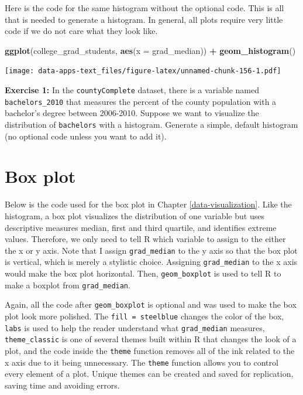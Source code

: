 \documentclass[
]{book}
\newenvironment{Shaded}{\begin{snugshade}}{\end{snugshade}}
\newcommand{\DataTypeTok}[1]{\textcolor[rgb]{0.13,0.29,0.53}{#1}}
\newcommand{\KeywordTok}[1]{\textcolor[rgb]{0.13,0.29,0.53}{\textbf{#1}}}
\newcommand{\NormalTok}[1]{#1}
\newcommand{\OperatorTok}[1]{\textcolor[rgb]{0.81,0.36,0.00}{\textbf{#1}}}
\newcommand{\StringTok}[1]{\textcolor[rgb]{0.31,0.60,0.02}{#1}}
\newenvironment{learncheck}%
{%
  \par\vspace{\baselineskip}\noindent 
  \color{Exercise}\begin{itshape}%
  \par\vspace{\baselineskip}\noindent\ignorespaces 
}%
{%
  \end{itshape}\ignorespacesafterend 
}
\begin{document}
Here is the code for the same histogram without the optional code. This is all that is needed to generate a histogram. In general, all plots require very little code if we do not care what they look like.

\begin{Shaded}
\begin{Highlighting}[]
\KeywordTok{ggplot}\NormalTok{(college_grad_students, }\KeywordTok{aes}\NormalTok{(}\DataTypeTok{x =}\NormalTok{ grad_median)) }\OperatorTok{+}
\StringTok{  }\KeywordTok{geom_histogram}\NormalTok{()}
\end{Highlighting}
\end{Shaded}

\texttt{[image: data-apps-text\_files/figure-latex/unnamed-chunk-156-1.pdf]}

\begin{learncheck}
\textbf{Exercise 1:} In the \texttt{countyComplete} dataset, there is a
variable named \texttt{bachelors\_2010} that measures the percent of the
county population with a bachelor's degree between 2006-2010. Suppose we
want to visualize the distribution of \texttt{bachelors} with a
histogram. Generate a simple, default histogram (no optional code unless
you want to add it).
\end{learncheck}

\hypertarget{box-plot}{%
\section{Box plot}\label{box-plot}}

Below is the code used for the box plot in Chapter \ref{data-visualization}. Like the histogram, a box plot visualizes the distribution of one variable but uses descriptive measures median, first and third quartile, and identifies extreme values. Therefore, we only need to tell R which variable to assign to the either the x or y axis. Note that I assign \texttt{grad\_median} to the y axis so that the box plot is vertical, which is merely a stylistic choice. Assigning \texttt{grad\_median} to the x axis would make the box plot horizontal. Then, \texttt{geom\_boxplot} is used to tell R to make a boxplot from \texttt{grad\_median}.

Again, all the code after \texttt{geom\_boxplot} is optional and was used to make the box plot look more polished. The \texttt{fill\ =\ \textquotesingle{}steelblue\textquotesingle{}} changes the color of the box, \texttt{labs} is used to help the reader understand what \texttt{grad\_median} measures, \texttt{theme\_classic} is one of several themes built within R that changes the look of a plot, and the code inside the \texttt{theme} function removes all of the ink related to the x axis due to it being unnecessary. The \texttt{theme} function allows you to control every element of a plot. Unique themes can be created and saved for replication, saving time and avoiding errors.
\end{document}
